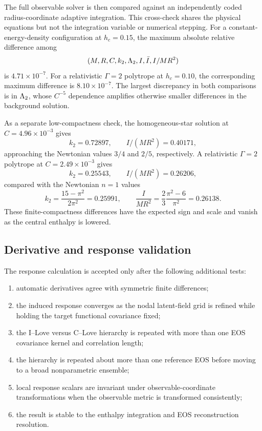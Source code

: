 The full observable solver is then compared against an independently coded
radius-coordinate adaptive integration.  This cross-check shares the
physical equations but not the integration variable or numerical stepping.
For a constant-energy-density configuration at \(h_c=0.15\), the maximum
absolute relative difference among
\[
(M,R,C,k_2,\Lambda_2,I,\bar I,I/MR^2)
\]
is \(4.71\times10^{-7}\).  For a relativistic \(\Gamma=2\) polytrope at
\(h_c=0.10\), the corresponding maximum difference is
\(8.10\times10^{-7}\).  The largest discrepancy in both comparisons is in
\(\Lambda_2\), whose \(C^{-5}\) dependence amplifies otherwise smaller
differences in the background solution.

As a separate low-compactness check, the homogeneous-star solution at
\(C=4.96\times10^{-3}\) gives
\[
k_2=0.72897,\qquad I/(MR^2)=0.40171,
\]
approaching the Newtonian values \(3/4\) and \(2/5\), respectively.  A
relativistic \(\Gamma=2\) polytrope at
\(C=2.49\times10^{-3}\) gives
\[
k_2=0.25543,\qquad I/(MR^2)=0.26206,
\]
compared with the Newtonian \(n=1\) values
\[
k_2=\frac{15-\pi^2}{2\pi^2}=0.25991,\qquad
\frac{I}{MR^2}
=\frac{2}{3}\frac{\pi^2-6}{\pi^2}=0.26138.
\]
These finite-compactness differences have the expected sign and scale and
vanish as the central enthalpy is lowered.

\subsection{Derivative and response validation}

The response calculation is accepted only after the following additional
tests:
\begin{enumerate}
    \item automatic derivatives agree with symmetric finite differences;
    \item the induced response converges as the nodal latent-field grid is
    refined while holding the target functional covariance fixed;
    \item the I--Love versus C--Love hierarchy is repeated with more than one
    EOS covariance kernel and correlation length;
    \item the hierarchy is repeated about more than one reference EOS before
    moving to a broad nonparametric ensemble;
    \item local response scalars are invariant under observable-coordinate
    transformations when the observable metric is transformed consistently;
    \item the result is stable to the enthalpy integration and EOS
    reconstruction resolution.
\end{enumerate}


